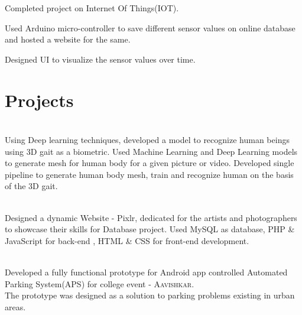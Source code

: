 \documentclass[]{deedy-resume-openfont}
\begin{document}
\begin{tightemize}
\item Completed project on Internet Of Things(IOT).
\item Used Arduino micro-controller to save different sensor values on online database and hosted a website for the same.
\item Designed UI to visualize the sensor values over time.
\end{tightemize}
\sectionsep


\section{Projects}

 \\
\normalsize Using Deep learning techniques, developed a model to recognize human beings using 3D gait as a biometric. Used Machine Learning and Deep Learning models to generate mesh for human body for a given picture or video. Developed single pipeline to generate human body mesh, train and recognize human on the basis of the 3D gait.	\\

\vspace{\topsep} %

	\\
\normalsize Designed a dynamic Website - Pixlr, dedicated for the artists and
photographers to showcase their skills for Database project. Used MySQL as database, PHP \& JavaScript for back-end , HTML \& CSS for front-end development.\\
\vspace{\topsep} %

	\\
\normalsize Developed a fully functional prototype for Android app controlled
Automated Parking System(APS) for college event - \textsc{Aavishkar}.\\
The prototype was designed as a solution to parking problems existing in urban areas.
\sectionsep
\end{document}
